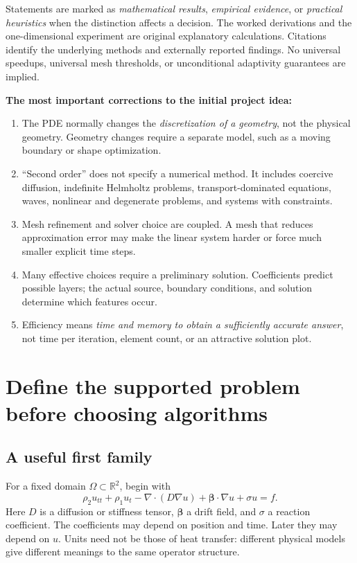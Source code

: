 \documentclass[11pt,a4paper]{article}
\newcommand{\R}{\mathbb{R}}
\begin{document}
Statements are marked as \emph{mathematical results}, \emph{empirical evidence}, or \emph{practical heuristics} when the distinction affects a decision. The worked derivations and the one-dimensional experiment are original explanatory calculations. Citations identify the underlying methods and externally reported findings. No universal speedups, universal mesh thresholds, or unconditional adaptivity guarantees are implied.

\textbf{The most important corrections to the initial project idea:}
\begin{enumerate}
\item The PDE normally changes the \emph{discretization of a geometry}, not the physical geometry. Geometry changes require a separate model, such as a moving boundary or shape optimization.
\item ``Second order'' does not specify a numerical method. It includes coercive diffusion, indefinite Helmholtz problems, transport-dominated equations, waves, nonlinear and degenerate problems, and systems with constraints.
\item Mesh refinement and solver choice are coupled. A mesh that reduces approximation error may make the linear system harder or force much smaller explicit time steps.
\item Many effective choices require a preliminary solution. Coefficients predict possible layers; the actual source, boundary conditions, and solution determine which features occur.
\item Efficiency means \emph{time and memory to obtain a sufficiently accurate answer}, not time per iteration, element count, or an attractive solution plot.
\end{enumerate}
\tableofcontents
\clearpage

\section{Define the supported problem before choosing algorithms}\label{sec:scope}
\subsection{A useful first family}
For a fixed domain $\Omega\subset\R^2$, begin with
\begin{equation}\label{eq:family}
\rho_2 u_{tt}+\rho_1 u_t
-\nabla\cdot(D\nabla u)+\boldsymbol\beta\cdot\nabla u+\sigma u=f.
\end{equation}
Here $D$ is a diffusion or stiffness tensor, $\boldsymbol\beta$ a drift field, and $\sigma$ a reaction coefficient. The coefficients may depend on position and time. Later they may depend on $u$. Units need not be those of heat transfer: different physical models give different meanings to the same operator structure.
\end{document}
